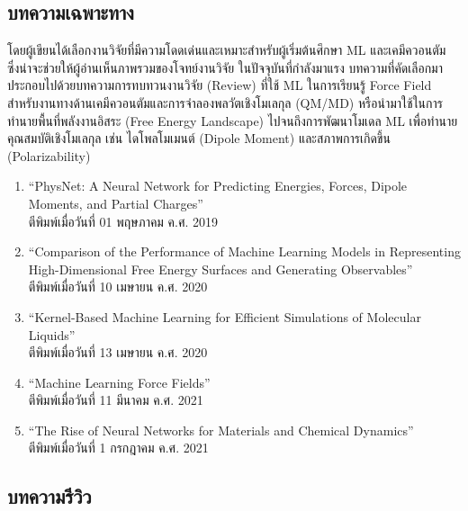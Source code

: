 \subsection{บทความเฉพาะทาง}
\label{ssec:pred_misc_papers_specific}

โดยผู้เขียนได้เลือกงานวิจัยที่มีความโดดเด่นและเหมาะสำหรับผู้เริ่มต้นศึกษา ML และเคมีควอนตัม ซึ่งน่าจะช่วยให้ผู้อ่านเห็นภาพรวมของโจทย์งานวิจัย%
ในปัจจุบันที่กำลังมาแรง บทความที่คัดเลือกมาประกอบไปด้วยบทความการทบทวนงานวิจัย (Review) ที่ใช้ ML ในการเรียนรู้ Force Field 
สำหรับงานทางด้านเคมีควอนตัมและการจําลองพลวัตเชิงโมเลกุล (QM/MD) หรือนำมาใช้ในการทำนายพื้นที่พลังงานอิสระ (Free Energy Landscape)
ไปจนถึงการพัฒนาโมเดล ML เพื่อทำนายคุณสมบัติเชิงโมเลกุล เช่น ไดโพลโมเมนต์ (Dipole Moment) และสภาพการเกิดขึ้น (Polarizability)

\begin{enumerate}
    \item \enquote{PhysNet: A Neural Network for Predicting Energies, Forces, Dipole Moments, and 
    Partial Charges}\autocite{unke2019}\\
    ตีพิมพ์เมื่อวันที่ 01 พฤษภาคม ค.ศ. 2019
    
    \item \enquote{Comparison of the Performance of Machine Learning Models in Representing High-Dimensional 
    Free Energy Surfaces and Generating Observables}\autocite{cendagorta2020}\\
    ตีพิมพ์เมื่อวันที่ 10 เมษายน ค.ศ. 2020
    
    \item \enquote{Kernel-Based Machine Learning for Efficient Simulations of Molecular Liquids}\autocite{scherer2020}\\
    ตีพิมพ์เมื่อวันที่ 13 เมษายน ค.ศ. 2020

    \item \enquote{Machine Learning Force Fields}\autocite{unke2021}\\
    ตีพิมพ์เมื่อวันที่ 11 มีนาคม ค.ศ. 2021

    \item \enquote{The Rise of Neural Networks for Materials and Chemical Dynamics}\autocite{kulichenko2021}\\
    ตีพิมพ์เมื่อวันที่ 1 กรกฎาคม ค.ศ. 2021

\end{enumerate}

\subsection{บทความรีวิว}
\label{ssec:pred_misc_papers_review}

